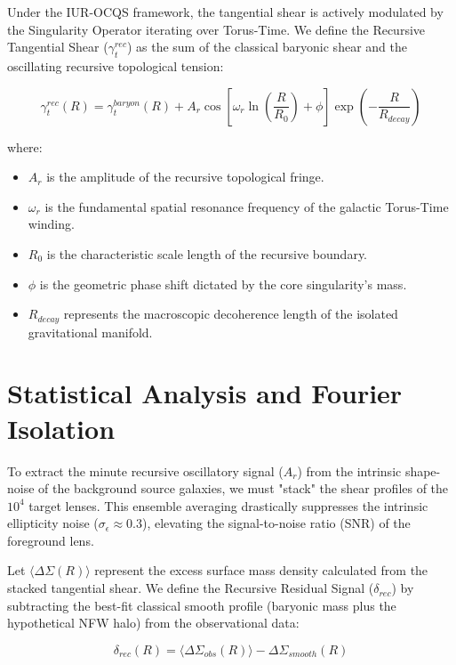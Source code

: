 \documentclass[12pt,openany]{book}
\begin{document}
Under the IUR-OCQS framework, the tangential shear is actively modulated by the Singularity Operator iterating over Torus-Time. We define the Recursive Tangential Shear ($\gamma_t^{rec}$) as the sum of the classical baryonic shear and the oscillating recursive topological tension:

\begin{equation}
\gamma_t^{rec}(R) = \gamma_t^{baryon}(R) + A_r \cos\left[ \omega_r \ln\left(\frac{R}{R_0}\right) + \phi \right] \exp\left(-\frac{R}{R_{decay}}\right)
\end{equation}

where:
\begin{itemize}
    \item $A_r$ is the amplitude of the recursive topological fringe.
    \item $\omega_r$ is the fundamental spatial resonance frequency of the galactic Torus-Time winding.
    \item $R_0$ is the characteristic scale length of the recursive boundary.
    \item $\phi$ is the geometric phase shift dictated by the core singularity's mass.
    \item $R_{decay}$ represents the macroscopic decoherence length of the isolated gravitational manifold.
\end{itemize}

\section{Statistical Analysis and Fourier Isolation}
To extract the minute recursive oscillatory signal ($A_r$) from the intrinsic shape-noise of the background source galaxies, we must "stack" the shear profiles of the $10^4$ target lenses. This ensemble averaging drastically suppresses the intrinsic ellipticity noise ($\sigma_\epsilon \approx 0.3$), elevating the signal-to-noise ratio (SNR) of the foreground lens.

Let $\langle\Delta\Sigma(R)\rangle$ represent the excess surface mass density calculated from the stacked tangential shear. We define the Recursive Residual Signal ($\delta_{rec}$) by subtracting the best-fit classical smooth profile (baryonic mass plus the hypothetical NFW halo) from the observational data:

\begin{equation}
\delta_{rec}(R) = \langle\Delta\Sigma_{obs}(R)\rangle - \Delta\Sigma_{smooth}(R)
\end{equation}
\end{document}
